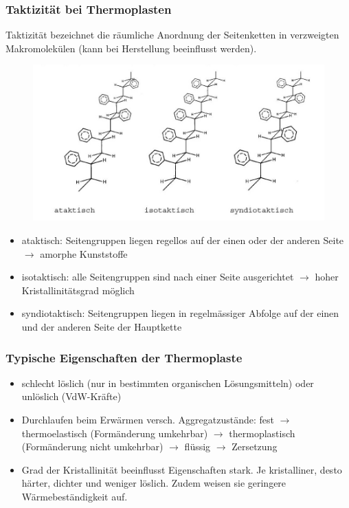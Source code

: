 \subsubsection{Taktizität bei Thermoplasten}
Taktizität bezeichnet die räumliche Anordnung der Seitenketten in verzweigten Makromolekülen (kann bei Herstellung beeinflusst werden).

\begin{figure}[htbp]
	\centering
	\includegraphics[width=0.7\linewidth]{images/7_Taktizitaet.png}
\end{figure}

\begin{itemize}
	\item ataktisch: Seitengruppen liegen regellos auf der einen oder der anderen Seite $\rightarrow$ amorphe Kunststoffe
	\item isotaktisch: alle Seitengruppen sind nach einer Seite ausgerichtet $\rightarrow$ hoher Kristallinitätsgrad möglich
	\item syndiotaktisch: Seitengruppen liegen in regelmässiger Abfolge auf der einen und der anderen Seite der Hauptkette
\end{itemize}

\subsubsection{Typische Eigenschaften der Thermoplaste}
\begin{itemize}
	\item schlecht löslich (nur in bestimmten organischen Lösungsmitteln) oder unlöslich (VdW-Kräfte)
	\item Durchlaufen beim Erwärmen versch. Aggregatzustände: fest $\rightarrow$ thermoelastisch (Formänderung umkehrbar) $\rightarrow$ thermoplastisch (Formänderung nicht umkehrbar) $\rightarrow$ flüssig $\rightarrow$ Zersetzung
	\item Grad der Kristallinität beeinflusst Eigenschaften stark. Je kristalliner, desto härter, dichter und weniger löslich. Zudem weisen sie geringere Wärmebeständigkeit auf.
\end{itemize}

